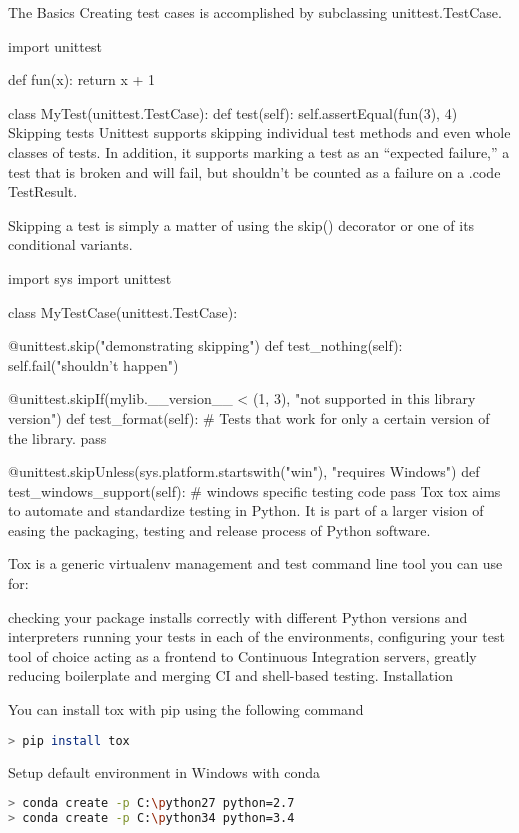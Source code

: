The Basics
Creating test cases is accomplished by subclassing unittest.TestCase.

import unittest

def fun(x):
    return x + 1

class MyTest(unittest.TestCase):
    def test(self):
        self.assertEqual(fun(3), 4)
Skipping tests
Unittest supports skipping individual test methods and even whole classes of tests. In addition, it supports marking a test as an “expected failure,” a test that is broken and will fail, but shouldn’t be counted as a failure on a .code TestResult.

Skipping a test is simply a matter of using the skip() decorator or one of its conditional variants.

import sys
import unittest

class MyTestCase(unittest.TestCase):

    @unittest.skip("demonstrating skipping")
    def test_nothing(self):
        self.fail("shouldn't happen")

    @unittest.skipIf(mylib.__version__ < (1, 3),
                     "not supported in this library version")
    def test_format(self):
        # Tests that work for only a certain version of the library.
        pass

    @unittest.skipUnless(sys.platform.startswith("win"), "requires Windows")
    def test_windows_support(self):
        # windows specific testing code
        pass
Tox
tox aims to automate and standardize testing in Python. It is part of a larger vision of easing the packaging, testing and release process of Python software.

Tox is a generic virtualenv management and test command line tool you can use for:

checking your package installs correctly with different Python versions and interpreters
running your tests in each of the environments, configuring your test tool of choice
acting as a frontend to Continuous Integration servers, greatly reducing boilerplate and merging CI and shell-based testing.
Installation

You can install tox with pip using the following command

\begin{lstlisting}[language=bash]
> pip install tox
\end{lstlisting}

Setup default environment in Windows with conda

\begin{lstlisting}[language=bash]
> conda create -p C:\python27 python=2.7
> conda create -p C:\python34 python=3.4
\end{lstlisting}

